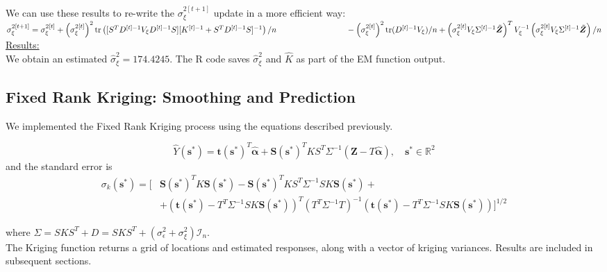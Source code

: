 \documentclass[11pt]{article}
\newcommand{\myindent}{\hspace*{1cm}}
\begin{document}
We can use these results to re-write the $\sigma_\xi^{2[t+1]}$ update in a more efficient way: \\

\myindent \myindent $\sigma_\xi^{2[t+1]} = \sigma_\xi^{2[t]} 
+ \left( \sigma_\xi^{2[t]} \right)^2 \text{tr} \left([S^TD^{[t]-1}V_\xi D^{[t]-1}S][K^{[t]-1} + S^TD^{[t]-1}S]^{-1} \right)/n \\ \myindent \myindent \myindent
- \left( \sigma_\xi^{2[t]} \right)^2 \text{tr}(D^{[t]-1}V_\xi)/n
+ \left(\sigma_\xi^{2[t]}V_\xi \Sigma^{[t]-1} \tilde{\bm{Z}}\right)^T
V_\xi^{-1}
\left(\sigma_\xi^{2[t]}V_\xi \Sigma^{[t]-1} \tilde{\bm{Z}}\right)/n$\\


\underline{Results:}\\
We obtain an estimated $\hat{\sigma}^2_{\xi} = 174.4245$.  The R code saves $\hat{\sigma}^2_{\xi}$ and $\hat{K}$ as part of the EM function output.\\

\subsection{Fixed Rank Kriging: Smoothing and Prediction}

We implemented the Fixed Rank Kriging process using the equations described previously.

\begin{equation}
\hat{Y}(\bm{s}^*) = \bm{t}(\bm{s}^*)^T \hat{\bm{\alpha}} + \bm{S}(\bm{s}^*)^T K S^T \Sigma^{-1} (\bm{Z} - T \hat{\bm{\alpha}}), \quad \bm{s}^* \in \mathbb{R}^2
\end{equation}
and the standard error is
\begin{equation}
\begin{split}
\sigma_k(\bm{s}^*) = \big[ &\bm{S}(\bm{s}^*)^T K \bm{S}(\bm{s}^*) - \bm{S}(\bm{s}^*)^T K S^T \Sigma^{-1} S K \bm{S}(\bm{s}^*) + 
\\
&+ (\bm{t}(\bm{s}^*) - T^T \Sigma^{-1} S K \bm{S}(\bm{s}^*))^T (T^T \Sigma^{-1} T)^{-1} (\bm{t}(\bm{s}^*) - T^T \Sigma^{-1} S K \bm{S}(\bm{s}^*)) \big]^{1/2}
\end{split}
\end{equation}

where $\Sigma = S K S^T + D = S K S^T + (\sigma_\epsilon^2 + \sigma_\xi^2) \mathcal{I}_n$.\\

The Kriging function returns a grid of locations and estimated responses, along with a vector of kriging variances.  Results are included in subsequent sections. \\
\end{document}
